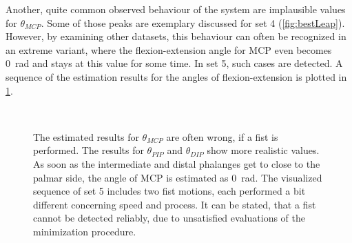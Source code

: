 Another, quite common observed behaviour of the system are implausible values for $ \theta_{MCP} $. Some of those peaks are exemplary discussed for set 4 (\ref{fig:bestLeap}). However, by examining other datasets, this behaviour can often be recognized in an extreme variant, where the flexion-extension angle for \ac{MCP} even becomes \SI{0}{\radian} and stays at this value for some time. In set 5, such cases are detected. A sequence of the estimation results for the angles of flexion-extension is plotted in \ref{fig:set5}.
\begin{figure}[!htb]
\centering
{}\\
\caption[Occurrence of wrong estimated states for $ \theta_{MCP} $]
{The estimated results for $ \theta_{MCP} $ are often wrong, if a fist is performed. The results for $ \theta_{PIP} $ and $ \theta_{DIP} $ show more realistic values. As soon as the intermediate and distal phalanges get to close to the palmar side, the angle of \ac{MCP} is estimated as \SI{0}{\radian}. The visualized sequence of set 5 includes two fist motions, each performed a bit different concerning speed and process. It can be stated, that a fist cannot be detected reliably, due to unsatisfied evaluations of the minimization procedure.}
\label{fig:set5}
\end{figure}
